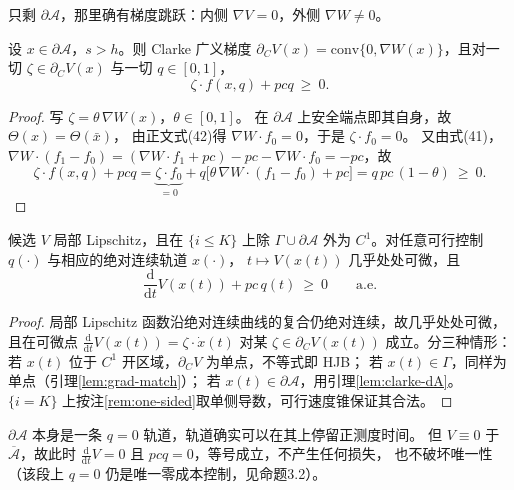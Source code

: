 只剩 $\partial\mathcal{A}$，那里确有梯度跳跃：内侧 $\nabla V=0$，外侧 $\nabla W\neq0$。

\begin{lemma}[安全边界上的广义梯度验证]
\label{lem:clarke-dA}
设 $x\in\partial\mathcal{A}$，$s>h$。则 Clarke 广义梯度
$\partial_C V(x)=\mathrm{conv}\{0,\nabla W(x)\}$，且对一切
$\zeta\in\partial_C V(x)$ 与一切 $q\in[0,1]$，
\begin{equation}
  \zeta\cdot f(x,q)+pcq\ \ge\ 0 .
  \label{eq:B-clarke-ineq}
\end{equation}
\end{lemma}

\begin{proof}
写 $\zeta=\theta\,\nabla W(x)$，$\theta\in[0,1]$。
在 $\partial\mathcal{A}$ 上安全端点即其自身，故 $\Theta(x)=\Theta(\bar x)$，
由正文式(42)得 $\nabla W\cdot f_0=0$，于是 $\zeta\cdot f_0=0$。
又由式(41)，$\nabla W\cdot(f_1-f_0)=(\nabla W\cdot f_1+pc)-pc-\nabla W\cdot f_0=-pc$，故
\[
  \zeta\cdot f(x,q)+pcq
  =\underbrace{\zeta\cdot f_0}_{=0}+q\bigl[\theta\,\nabla W\cdot(f_1-f_0)+pc\bigr]
  =q\,pc\,(1-\theta)\ \ge\ 0 .
\]
\end{proof}

\begin{proposition}[验证不等式的严格形式]
\label{prop:verification-rigorous}
候选 $V$ 局部 Lipschitz，且在 $\{i\le K\}$ 上除 $\Gamma\cup\partial\mathcal{A}$
外为 $C^1$。对任意可行控制 $q(\cdot)$ 与相应的绝对连续轨道 $x(\cdot)$，
$t\mapsto V(x(t))$ 几乎处处可微，且
\begin{equation}
  \frac{\mathrm{d}}{\mathrm{d}t}V(x(t))+pc\,q(t)\ \ge\ 0
  \qquad\text{a.e.}
\end{equation}
\end{proposition}

\begin{proof}
局部 Lipschitz 函数沿绝对连续曲线的复合仍绝对连续，故几乎处处可微，
且在可微点 $\frac{\mathrm{d}}{\mathrm{d}t}V(x(t))=\zeta\cdot\dot x(t)$
对某 $\zeta\in\partial_C V(x(t))$ 成立。分三种情形：
若 $x(t)$ 位于 $C^1$ 开区域，$\partial_C V$ 为单点，不等式即 HJB；
若 $x(t)\in\Gamma$，同样为单点（引理\ref{lem:grad-match}）；
若 $x(t)\in\partial\mathcal{A}$，用引理\ref{lem:clarke-dA}。
$\{i=K\}$ 上按注\ref{rem:one-sided}取单侧导数，可行速度锥保证其合法。
\end{proof}

\begin{remark}
$\partial\mathcal{A}$ 本身是一条 $q=0$ 轨道，轨道确实可以在其上停留正测度时间。
但 $V\equiv0$ 于 $\overline{\mathcal{A}}$，故此时
$\frac{\mathrm{d}}{\mathrm{d}t}V=0$ 且 $pcq=0$，等号成立，不产生任何损失，
也不破坏唯一性（该段上 $q=0$ 仍是唯一零成本控制，见命题3.2）。
\end{remark}


